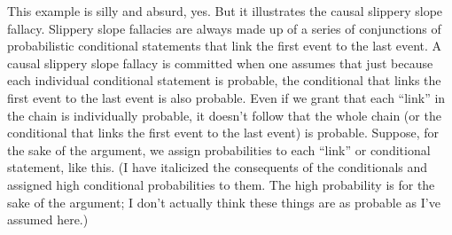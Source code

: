 This example is silly and absurd, yes. But it illustrates the causal slippery slope fallacy. Slippery slope fallacies are always made up of a series of conjunctions of probabilistic conditional statements that link the first event to the last event. A causal slippery slope fallacy is committed when one assumes that just because each individual conditional statement is probable, the conditional that links the first event to the last event is also probable. Even if we grant that each ``link'' in the chain is individually probable, it doesn't follow that the whole chain (or the conditional that links the first event to the last event) is probable. Suppose, for the sake of the argument, we assign probabilities to each ``link'' or conditional statement, like this. (I have italicized the consequents of the conditionals and assigned high conditional probabilities to them. The high probability is for the sake of the argument; I don't actually think these things are as probable as I've assumed here.)

\begin{kormanize}
\end{kormanize}

